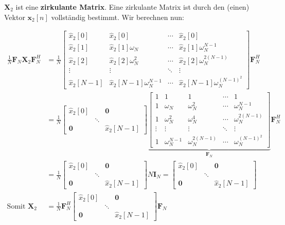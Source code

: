 \documentclass[11pt]{article}
\begin{document}
$\mathbf{X}_2$ ist eine \textbf{zirkulante Matrix}. Eine zirkulante Matrix ist durch den (einen) Vektor $\mathbf{x}_2[n]$ vollständig bestimmt. Wir berechnen nun:

\begin{align*}
    \frac{1}{N}\mathbf{F}_N \mathbf{X}_2 \mathbf{F}_N^H &= \frac{1}{N} \begin{bmatrix}
        \hat{x}_2[0] & \hat{x}_2[0] & \cdots & \hat{x}_2[0] \\
        \hat{x}_2[1] & \hat{x}_2[1]\omega_N & \cdots & \hat{x}_2[1]\omega_N^{N-1} \\
        \hat{x}_2[2] & \hat{x}_2[2]\omega_N^2 & \cdots & \hat{x}_2[2]\omega_N^{2(N-1)} \\
        \vdots & \vdots & \ddots & \vdots \\
        \hat{x}_2[N-1] & \hat{x}_2[N-1]\omega_N^{N-1} & \cdots & \hat{x}_2[N-1]\omega_N^{(N-1)^2}
    \end{bmatrix} \mathbf{F}_N^H \\
    &= \frac{1}{N} \begin{bmatrix}
        \hat{x}_2[0] & & \mathbf{0} \\
        & \ddots & \\
        \mathbf{0} & & \hat{x}_2[N-1]
    \end{bmatrix} \underbrace{\begin{bmatrix}
        1 & 1 & 1 & \cdots & 1 \\
        1 & \omega_N & \omega_N^2 & \cdots & \omega_N^{N-1} \\
        1 & \omega_N^2 & \omega_N^4 & \cdots & \omega_N^{2(N-1)} \\
        \vdots & \vdots & \vdots & \ddots & \vdots \\
        1 & \omega_N^{N-1} & \omega_N^{2(N-1)} & \cdots & \omega_N^{(N-1)^2}
    \end{bmatrix}}_{\mathbf{F}_N} \mathbf{F}_N^H \\
    &= \frac{1}{N} \begin{bmatrix}
        \hat{x}_2[0] & & \mathbf{0} \\
        & \ddots & \\
        \mathbf{0} & & \hat{x}_2[N-1]
    \end{bmatrix} N \mathbf{I}_N = \begin{bmatrix}
        \hat{x}_2[0] & & \mathbf{0} \\
        & \ddots & \\
        \mathbf{0} & & \hat{x}_2[N-1]
    \end{bmatrix} \\
    \text{Somit } \mathbf{X}_2 &= \frac{1}{N} \mathbf{F}_N^H  \begin{bmatrix}
        \hat{x}_2[0] & & \mathbf{0} \\
        & \ddots & \\
        \mathbf{0} & & \hat{x}_2[N-1]
    \end{bmatrix}   \mathbf{F}_N
\end{align*}
\end{document}
